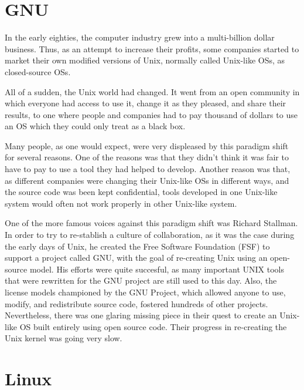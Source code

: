 \section{GNU}

In the early eighties, the computer industry grew into a multi-billion dollar business. Thus, as an attempt to increase their profits, some companies started to market their own modified versions of Unix, normally called Unix-like \acs{OS}s, as closed-source \acs{OS}s.

All of a sudden, the Unix world had changed. It went from an open community in which everyone had access to use it, change it as they pleased, and share their results, to one where people and companies had to pay thousand of dollars to use an \acs{OS} which they could only treat as a black box.

Many people, as one would expect, were very displeased by this paradigm shift for several reasons. One of the reasons was that they didn't think it was fair to have to pay to use a tool they had helped to develop. Another reason was that, as different companies were changing their Unix-like \acs{OS}s in different ways, and the source code was been kept confidential, tools developed in one Unix-like system would often not work properly in other Unix-like system.

One of the more famous voices against this paradigm shift was Richard Stallman. In order to try to re-stablish a culture of collaboration, as it was the case during the early days of Unix, he created the Free Software Foundation (\acs{FSF}) to support a project called \acs{GNU}, with the goal of re-creating Unix using an open-source model. His efforts were quite succesful, as many important UNIX tools that were rewritten for the \acs{GNU} project are still used to this day. Also, the license models championed by the GNU Project, which allowed anyone to use, modify, and redistribute source code, fostered hundreds of other projects. Nevertheless, there was one glaring missing piece in their quest to create an Unix-like \acs{OS} built entirely using open source code. Their progress in re-creating the Unix kernel was going very slow.

\section{Linux}

